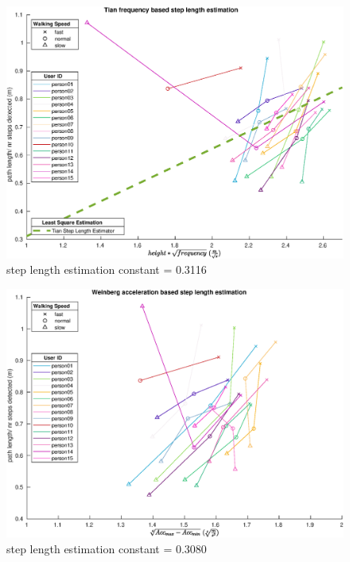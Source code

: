 	\begin{figure}[H]
	\centering
	\includegraphics[width=\linewidth]{images/20201113_1634_tian}
	\caption{step length estimation constant = 0.3116}
	\label{fig:step_length_tian}
	\end{figure}
	\begin{figure}[H]
		\centering
		\includegraphics[width=\linewidth]{images/20201113_1639_weinberg}
		\caption{step length estimation constant = 0.3080}
		\label{fig:step_length_weinberg}
	\end{figure}

